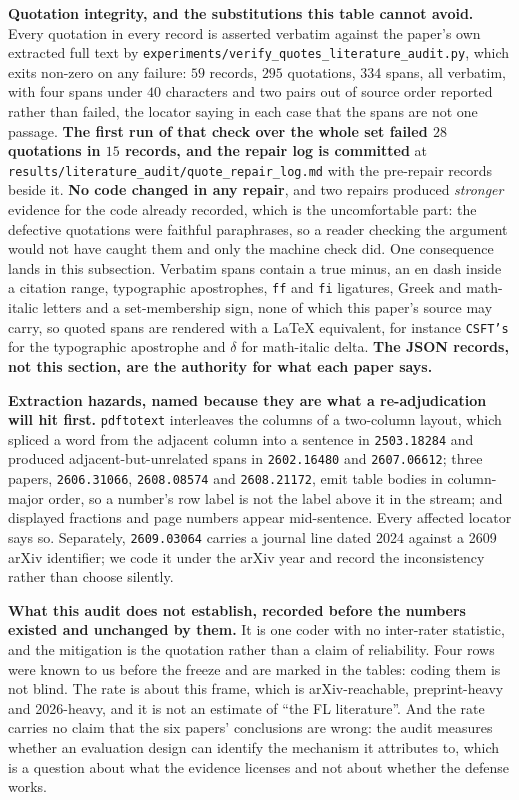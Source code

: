 \documentclass{article}
\begin{document}
\textbf{Quotation integrity, and the substitutions this table cannot avoid.} Every quotation in every record is asserted verbatim against the paper's own extracted full text by \texttt{experiments/\allowbreak verify\_quotes\_literature\_audit.py}, which exits non-zero on any failure: $59$ records, $295$ quotations, $334$ spans, all verbatim, with four spans under $40$ characters and two pairs out of source order reported rather than failed, the locator saying in each case that the spans are not one passage. \textbf{The first run of that check over the whole set failed $28$ quotations in $15$ records, and the repair log is committed} at \texttt{results/\allowbreak literature\_audit/\allowbreak quote\_repair\_log.md} with the pre-repair records beside it. \textbf{No code changed in any repair}, and two repairs produced \emph{stronger} evidence for the code already recorded, which is the uncomfortable part: the defective quotations were faithful paraphrases, so a reader checking the argument would not have caught them and only the machine check did. One consequence lands in this subsection. Verbatim spans contain a true minus, an en dash inside a citation range, typographic apostrophes, \texttt{ff} and \texttt{fi} ligatures, Greek and math-italic letters and a set-membership sign, none of which this paper's source may carry, so quoted spans are rendered with a LaTeX equivalent, for instance \texttt{CSFT's} for the typographic apostrophe and $\delta$ for math-italic delta. \textbf{The JSON records, not this section, are the authority for what each paper says.}

\textbf{Extraction hazards, named because they are what a re-adjudication will hit first.} \texttt{pdftotext} interleaves the columns of a two-column layout, which spliced a word from the adjacent column into a sentence in \texttt{2503.18284} and produced adjacent-but-unrelated spans in \texttt{2602.16480} and \texttt{2607.06612}; three papers, \texttt{2606.31066}, \texttt{2608.08574} and \texttt{2608.21172}, emit table bodies in column-major order, so a number's row label is not the label above it in the stream; and displayed fractions and page numbers appear mid-sentence. Every affected locator says so. Separately, \texttt{2609.03064} carries a journal line dated 2024 against a 2609 arXiv identifier; we code it under the arXiv year and record the inconsistency rather than choose silently.

\textbf{What this audit does not establish, recorded before the numbers existed and unchanged by them.} It is one coder with no inter-rater statistic, and the mitigation is the quotation rather than a claim of reliability. Four rows were known to us before the freeze and are marked in the tables: coding them is not blind. The rate is about this frame, which is arXiv-reachable, preprint-heavy and 2026-heavy, and it is not an estimate of ``the FL literature''. And the rate carries no claim that the six papers' conclusions are wrong: the audit measures whether an evaluation design can identify the mechanism it attributes to, which is a question about what the evidence licenses and not about whether the defense works.
\end{document}

